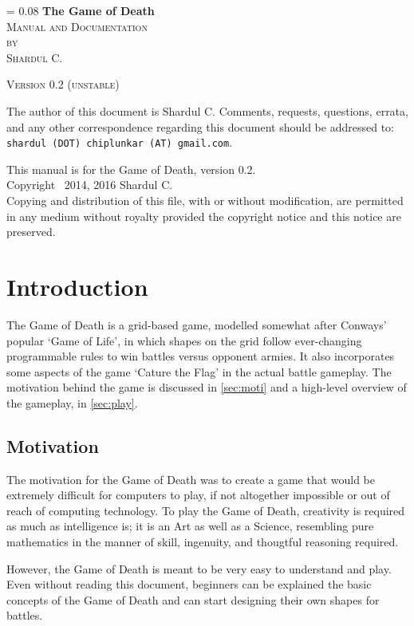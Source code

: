 \documentclass[a4paper,11pt]{article}
\newcommand*{\titleM}{\begingroup%
\drop = 0.08\textheight
\centering
\vspace*{\drop}
{\Huge\bfseries The Game of Death}\\[\baselineskip]
{\scshape Manual and Documentation}\\[1.5\baselineskip]
{\scshape by}\\[0.8\baselineskip]
{\large\scshape Shardul C.}\par
\vfill
{\scshape Version 0.2 (unstable)}\par
\vspace*{\drop}
\endgroup}
\begin{document}
\newlength{\drop}
\titleM
\thispagestyle{empty}

\newpage
\hspace{0pt}
\vfill

\noindent
The author of this document is Shardul C. Comments, requests, questions, errata, and any other correspondence regarding this document should be addressed to: \\
\texttt{shardul (DOT) chiplunkar (AT) gmail.com}.

\vspace{8pt}
\noindent
This manual is for the Game of Death, version 0.2. \\
Copyright \textcopyright\ 2014, 2016 Shardul C. \\
Copying and distribution of this file, with or without modification, are permitted in any medium without royalty provided the copyright notice and this notice are preserved.

\newpage
\tableofcontents


\newpage
\section{Introduction}

The Game of Death is a grid-based game, modelled somewhat after Conways' popular `Game of Life', in which shapes on the grid follow ever-changing programmable rules to win battles versus opponent armies. It also incorporates some aspects of the game `Cature the Flag' in the actual battle gameplay. The motivation behind the game is discussed in \hyperref[sec:moti]{\autoref*{sec:moti}} and a high-level overview of the gameplay, in \hyperref[sec:play]{\autoref*{sec:play}}.

\subsection{Motivation} \label{sec:moti}

The motivation for the Game of Death was to create a game that would be extremely difficult for computers to play, if not altogether impossible or out of reach of computing technology. To play the Game of Death, creativity is required as much as intelligence is; it is an Art as well as a Science, resembling pure mathematics in the manner of skill, ingenuity, and thougtful reasoning required.

However, the Game of Death is meant to be very easy to understand and play. Even without reading this document, beginners can be explained the basic concepts of the Game of Death and can start designing their own shapes for battles.
\end{document}
